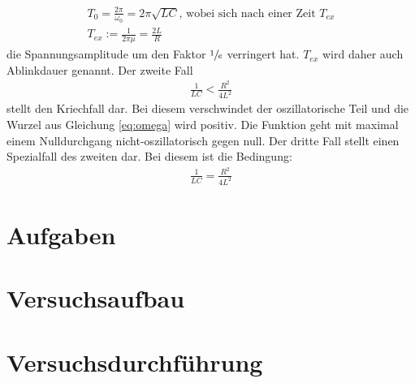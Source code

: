 \begin{align}
    T_0 =\frac{2 \pi}{\omega _0}=2 \pi \sqrt{LC} \text{, wobei sich nach einer Zeit $T_{ex}$}\\
    T_{ex}:= \frac{1}{2 \pi \mu}=\frac{2L}{R} \label{eq:Abkling}
\end{align}
\justify
die Spannungsamplitude um den Faktor $\sfrac{1}{e}$ verringert hat.
$T_{ex}$ wird daher auch Ablinkdauer genannt.
\justify
Der zweite Fall
\begin{align}
    \frac{1}{LC} <\frac{R^2}{4L^2} \label{eq:Fall2}
\end{align}
stellt den Kriechfall dar. Bei diesem verschwindet der oszillatorische Teil und
die Wurzel aus Gleichung \eqref{eq:omega} wird positiv.
Die Funktion geht mit maximal einem Nulldurchgang nicht-oszillatorisch gegen null.
\justify
Der dritte Fall stellt einen Spezialfall des zweiten dar.
Bei diesem ist die Bedingung:
\begin{align}
    \frac{1}{LC} = \frac{R^2}{4L^2} \label{eq:Fall3}
\end{align}





\section{Aufgaben}\justifying


\section{Versuchsaufbau}\justifying


\section{Versuchsdurchführung}\justifying



